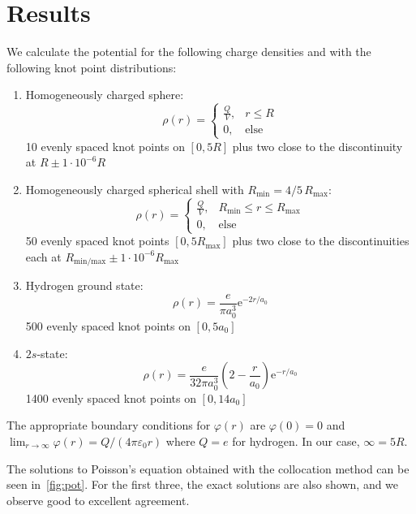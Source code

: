 \documentclass[a4paper,DIV=12,english]{scrartcl}
\begin{document}
\section{Results}
We calculate the potential for the following charge densities and with the following knot point distributions:
\begin{enumerate}
    \item Homogeneously charged sphere:
    \begin{equation}
        \rho(r) = \begin{cases}
            \frac{Q}{V}, & r \leq R \\
            0, & \text{else}
        \end{cases}
    \end{equation}
    10 evenly spaced knot points on $[0, 5R]$ plus two close to the discontinuity at $R\pm1\cdot 10^{-6}R$
    \item Homogeneously charged spherical shell with $R_\text{min} = 4/5\,R_\text{max}$:
    \begin{equation}
        \rho(r) = \begin{cases}
            \frac{Q}{V}, & R_\text{min} \leq r \leq R_\text{max} \\
            0, & \text{else}
        \end{cases}
    \end{equation}
    50 evenly spaced knot points $[0, 5R_\text{max}]$ plus two close to the discontinuities each at $R_\text{min/max}\pm1\cdot 10^{-6}R_\text{max}$
    \item Hydrogen ground state:
    \begin{equation}
        \rho(r) = \frac{e}{\pi a_0^3}\text{e}^{-2r/a_0}
    \end{equation}
    500 evenly spaced knot points on $[0, 5a_0]$
    \item $2s$-state:
    \begin{equation}
        \rho(r) = \frac{e}{32\pi a_0^3}\left(2 - \frac{r}{a_0}\right)\text{e}^{-r/a_0}
    \end{equation}
    1400 evenly spaced knot points on $[0, 14a_0]$
\end{enumerate}
The appropriate boundary conditions for $\varphi(r)$ are $\varphi(0) = 0$ and $\lim_{r\to\infty}\varphi(r)=Q/(4\pi\varepsilon_0 r)$ where $Q=e$ for hydrogen. In our case, $\infty=5R$.

The solutions to Poisson's equation obtained with the collocation method can be seen in~\ref{fig:pot}. For the first three, the exact solutions are also shown, and we observe good to excellent agreement.
\end{document}

